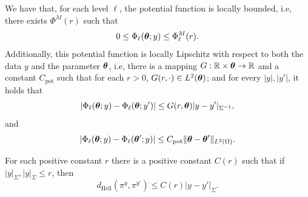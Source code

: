 \begin{proposition} We have that, for each level $\ell$, the potential function is locally bounded, i.e, there exists $\Phi^M(r)$ such that $$0\leq \Phi_{\ell}(\bm{\theta};y)\leq\Phi_\ell^M(r).$$ Additionally, this potential function is locally Lipschitz with respect to both the data $y$ and the parameter $\bm{\theta}$, i.e, there is a mapping $G: \mathbb{R}\times \bm{\theta} \rightarrow \mathbb{R}$ and a constant $C_\text{pot}$ such that for each $r > 0$, $G(r, \cdot) \in L^2(\bm{\theta})$; and for every $|y|,|y'|$, it holds that \begin{equation}\label{lip_in_y}\vert \Phi_{\ell}(\bm{\theta};y)-\Phi_{\ell}(\bm{\theta};y')\vert\leq G(r,\bm{\theta})|y-y'|_{\Sigma^{-1}},\end{equation} and
\begin{equation} \label{lip_in_te}\vert \Phi_{\ell}(\bm{\theta};y)-\Phi_{\ell}(\bm{\theta}';y)\vert\leq C_\text{pot}\Vert \bm{\theta} -\bm{\theta}'\Vert_{L^2(\Omega)}. \end{equation}
\end{proposition}
\begin{proposition}
	For each positive constant $r$ there is a positive constant $C(r)$ such that if $|y|_\Sigma,|y|_\Sigma\leq r$, then $$d_\text{Hell} (\pi^y,\pi^{y'})\leq C(r)|y-y'|_\Sigma.$$
\end{proposition} 


